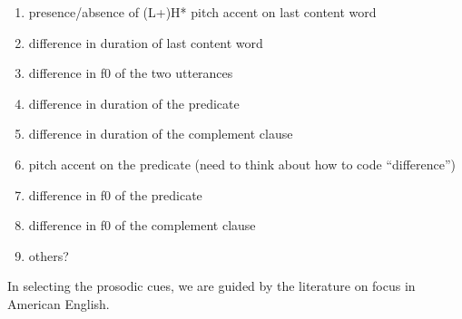 \documentclass[dina4,12pt,fleqn]{article}
\newcommand{\6}{\mbox{$[\hspace*{-.6mm}[$}}
\newcommand{\9}{\mbox{$]\hspace*{-.6mm}]$}}
\begin{document}
\begin{enumerate}[topsep=-3pt,itemsep=-.5ex]

\item presence/absence of (L+)H* pitch accent on last content word

\item difference in duration of last content word

\item difference in f0 of the two utterances

\item difference in duration of the predicate

\item difference in duration of the complement clause

\item pitch accent on the predicate (need to think about how to code ``difference'')

\item difference in f0 of the predicate

\item difference in f0 of the complement clause

\item others?

\end{enumerate}

In selecting the prosodic cues, we are guided by the literature on focus in American English.




\end{document}
